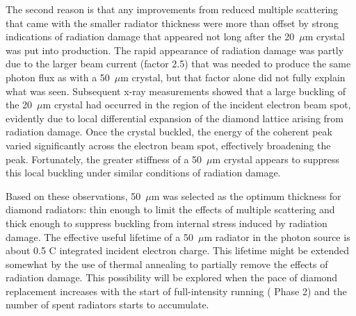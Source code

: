 The second reason is that any improvements
from reduced multiple scattering that came with the smaller radiator thickness
were more than offset by strong indications of radiation
damage that appeared not long after the 20~$\mu$m crystal was put into production.
The rapid appearance of radiation damage 
was partly due to the larger beam current (factor 2.5) that was needed to
produce the same photon flux as with a 50~$\mu$m crystal, but that factor alone
did not fully
explain what was seen. Subsequent x-ray measurements showed that a large buckling of
the 20~$\mu$m crystal had occurred in the region of the incident electron beam spot, 
evidently due to  local differential expansion of the diamond lattice arising from
radiation damage. Once the crystal buckled, the energy of the coherent
peak varied significantly across the electron beam spot, effectively broadening
the peak. Fortunately, the greater stiffness of a 50~$\mu$m crystal
appears to suppress this local buckling under similar conditions of radiation damage.

Based on these observations, 50~$\mu$m was selected as the
optimum thickness for \GX{} diamond radiators: thin enough to limit the effects
of multiple scattering and thick enough to suppress buckling from internal stress
induced by radiation damage. The effective useful lifetime of a 50~$\mu$m radiator
in the photon source is about 0.5 C integrated incident electron charge. 
This lifetime might be extended somewhat by the use of thermal annealing to partially remove the effects of radiation damage. 
This possibility will be explored when the pace of diamond replacement increases with the start of full-intensity running (\gx{} Phase 2) and the number of spent radiators starts to accumulate.

